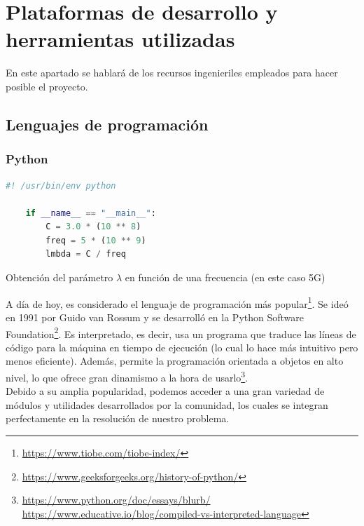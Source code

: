 \chapter{Plataformas de desarrollo y herramientas utilizadas}
\label{cap:capitulo3}

En este apartado se hablará de los recursos ingenieriles empleados para hacer posible el proyecto.

\section{Lenguajes de programación}
\label{sec:lenguajes_programacion}

\subsection{Python}
\label{subsec:python}

\begin{code}[hp]
	\begin{lstlisting}[language=Python]
	#! /usr/bin/env python
	
	if __name__ == "__main__":
		C = 3.0 * (10 ** 8)
		freq = 5 * (10 ** 9)
		lmbda = C / freq
	\end{lstlisting}
	\caption[Obtención del parámetro lambda en función de una frecuencia (en este caso 5G)]{Obtención del parámetro $\lambda$ en función de una frecuencia (en este caso 5G)}
	\label{cod:helloworld_python}
\end{code}

A día de hoy, es considerado el lenguaje de programación más popular\footnote[1]{\url{https://www.tiobe.com/tiobe-index/}}. Se ideó en 1991 por Guido van Rossum y se desarrolló en la Python Software Foundation\footnote[2]{\url{https://www.geeksforgeeks.org/history-of-python/}}. Es interpretado, es decir, usa un programa que traduce las líneas de código para la máquina en tiempo de ejecución (lo cual lo hace más intuitivo pero menos eficiente). Además, permite la programación orientada a objetos en alto nivel, lo que ofrece gran dinamismo a la hora de usarlo\footnote[3]{\url{https://www.python.org/doc/essays/blurb/} \url{https://www.educative.io/blog/compiled-vs-interpreted-language}}.\\

Debido a su amplia popularidad, podemos acceder a una gran variedad de módulos y utilidades desarrollados por la comunidad, los cuales se integran perfectamente en la resolución de nuestro problema.\\


